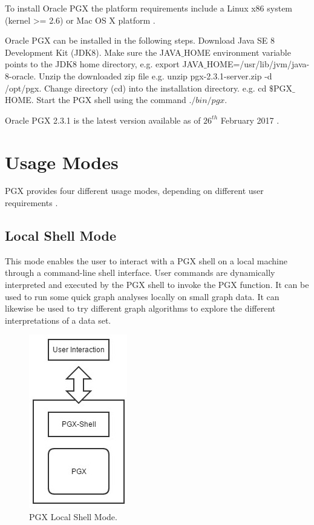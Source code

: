 \documentclass[9pt,twocolumn,twoside]{../../styles/osajnl}
\begin{document}
To install Oracle PGX the platform requirements include a Linux x86
system (kernel >= 2.6) or Mac OS X platform \cite{www-plat}.

Oracle PGX can be installed in the following steps. Download Java SE 8
Development Kit (JDK8). Make sure the JAVA$\_$HOME environment
variable points to the JDK8 home directory, e.g. export
JAVA$\_$HOME=/usr/lib/jvm/java-8-oracle. Unzip the downloaded zip file
e.g. unzip pgx-2.3.1-server.zip -d /opt/pgx. Change directory (cd)
into the installation directory. e.g. cd $\$$PGX$\_$HOME. Start the
PGX shell using the command $./bin/pgx$.

Oracle PGX 2.3.1 is the latest version available as of $26^{th}$
February 2017 \cite{www-plat}.


\section{Usage Modes}
PGX provides four different usage modes, depending on different user
requirements \cite{www-usage}.

\subsection{Local Shell Mode}
This mode enables the user to interact with a PGX shell on a local
machine through a command-line shell interface. User commands are
dynamically interpreted and executed by the PGX shell to invoke the
PGX function. It can be used to run some quick graph analyses locally
on small graph data. It can likewise be used to try different graph
algorithms to explore the different interpretations of a data set.
    \begin{figure}[h]
    \centering \includegraphics[scale=0.6]{images/2} \centering
    \caption{PGX Local Shell Mode.}
    \end{figure}
    
\end{document}
